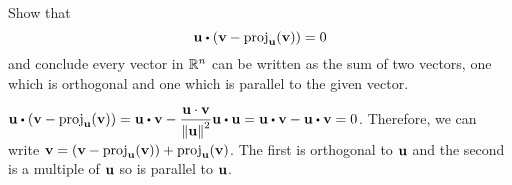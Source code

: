 \begin{ex}
  Show that
  \begin{equation*}
    \vect{u}\dotprod(\vect{v}-\proj_{\vect{u}}(\vect{v}))=0
  \end{equation*}
  and conclude every vector in $\mathbb{R}^n$ can be written as the sum of
  two vectors, one which is orthogonal and one which is parallel to
  the given vector.
  \begin{sol}
    $\displaystyle\vect{u}\dotprod(\vect{v}-\proj_{\vect{u}}(\vect{v}))
    = \vect{u} \dotprod \vect{v}-\frac{\vect{u}\cdot\vect{v}}{\norm{\vect{u}}^2}\vect{u}\dotprod\vect{u}
    = \vect{u} \dotprod \vect{v}
    - \vect{u} \dotprod \vect{v}
    =0$. Therefore, we can write
    $\vect{v} = (\vect{v} - \proj_{\vect{u}}(\vect{v})) +
    \proj_{\vect{u}}(\vect{v})$. The first is orthogonal to
    $\vect{u}$ and the second is a multiple of $\vect{u}$ so is
    parallel to $\vect{u}$.
  \end{sol}
\end{ex}

